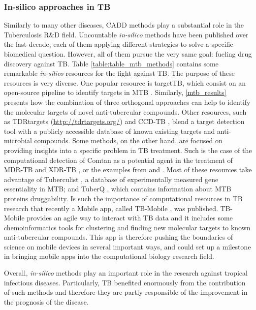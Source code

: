 \documentclass[11pt, b5paper,twoside]{tesi_upf}
\begin{document}
\subsubsection{In-silico approaches in TB}

\par Similarly to many other diseases, CADD methods play a substantial role in the Tuberculosis R$\&$D field. Uncountable \textit{in-silico} methods have been published over the last decade, each of them applying different strategies to solve a specific biomedical question. However, all of them pursue the very same goal: fueling drug discovery against TB. Table \ref{table:table_mtb_methods} contains some remarkable \textit{in-silico} resources for the fight
against TB. The purpose of these resources is very diverse. One popular resource is targetTB, which consist on an open-source pipeline to identify targets in MTB \cite{Raman2008a}. Similarly, \cref{mtb_results} presents how the combination of three orthogonal approaches can help to identify the molecular targets of novel anti-tubercular compounds. Other resources, such as TDRtargets \cite{Crowther2010} (\url{http://tdrtargets.org/}) and CCD-TB \cite{Ekins2010},  blend a target detection tool with a publicly accessible database of known existing targets and anti-microbial compounds. Some methods, on the other hand, are focused on providing insights into a specific problem in TB treatment. Such is the case of the computational detection of Comtan as a potential agent in the treatment of MDR-TB and XDR-TB \cite{Kinnings2009}, or the examples from \cite{DeJonge2007} and \cite{Kumar2009}. Most of these resources take advantage of Tuberculist \cite{Lew2011}, a database of experimentally measured gene essentiality in MTB; and TuberQ \cite{Radusky2014}, which contains information about MTB proteins druggability. Is such the importance of computational resources in TB research that recently a Mobile app, called TB-Mobile \cite{Ekins2013, Clark2014}, was published. TB-Mobile provides an agile way to interact with TB data and it includes some chemoinformatics tools for clustering and finding new molecular targets to known anti-tubercular compounds. This app is therefore pushing the boundaries of science on mobile devices in several important ways, and could set up a milestone in bringing mobile apps into the computational biology research field.

\par Overall, \textit{in-silico} methods play an important role in the research against tropical infectious diseases. Particularly, TB benefited enormously from the contribution of such methods and therefore they are partly responsible of the improvement in the prognosis of the disease. 
\end{document}
